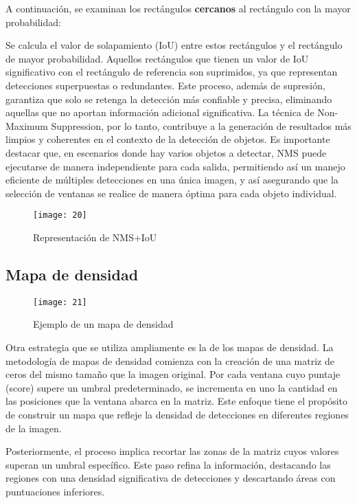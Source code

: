 	A continuación, se examinan los rectángulos \textbf{cercanos} al rectángulo con la mayor probabilidad:
	
	Se calcula el valor de solapamiento (IoU) entre estos rectángulos y el rectángulo de mayor probabilidad. Aquellos rectángulos que tienen un valor de IoU significativo con el rectángulo de referencia son suprimidos, ya que representan detecciones superpuestas o redundantes. Este proceso, además de supresión, garantiza que solo se retenga la detección más confiable y precisa, eliminando aquellas que no aportan información adicional significativa. La técnica de Non-Maximum Suppression, por lo tanto, contribuye a la generación de resultados más limpios y coherentes en el contexto de la detección de objetos.
Es importante destacar que, en escenarios donde hay varios objetos a detectar, NMS puede ejecutarse de manera independiente para cada salida, permitiendo así un manejo eficiente de múltiples detecciones en una única imagen, y así asegurando que la selección de ventanas se realice de manera óptima para cada objeto individual.
	
	\begin{figure}[ht]
	    \centering
		\texttt{[image: 20]}
		\caption{Representación de NMS+IoU}
	\end{figure}

	\subsection{Mapa de densidad}

	\begin{wrapfigure}[17]{R}{.43\textwidth} 
		\centering
		\texttt{[image: 21]}
		\caption{Ejemplo de un mapa de densidad}
	\end{wrapfigure}
	
	Otra estrategia que se utiliza ampliamente es la de los mapas de densidad. La metodología de mapas de densidad comienza con la creación de una matriz de ceros del mismo tamaño que la imagen original. Por cada ventana cuyo puntaje (score) supere un umbral predeterminado, se incrementa en uno la cantidad en las posiciones que la ventana abarca en la matriz. Este enfoque tiene el propósito de construir un mapa que refleje la densidad de detecciones en diferentes regiones de la imagen.
	
	Posteriormente, el proceso implica recortar las zonas de la matriz cuyos valores superan un umbral específico. Este paso refina la información, destacando las regiones con una densidad significativa de detecciones y descartando áreas con puntuaciones inferiores.
	
